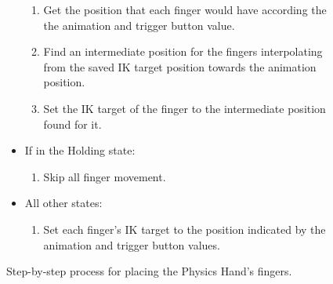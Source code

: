 \begin{figure}[H]
\begin{itemize}[noitemsep]
\begin{enumerate}[noitemsep]
\item Get the position that each finger would have according the the animation and trigger button value.
\item Find an intermediate position for the fingers interpolating from the saved IK target position towards the animation position.
\item Set the IK target of the finger to the intermediate position found for it.
\end{enumerate}
\item If in the Holding state:
\begin{enumerate}[noitemsep]
\item Skip all finger movement.
\end{enumerate}
\item All other states:
\begin{enumerate}[noitemsep]
\item Set each finger's IK target to the position indicated by the animation and trigger button values.
\end{enumerate}
\end{itemize}
\caption{Step-by-step process for placing the Physics Hand's fingers.}
\label{fig:stepByStepPhysicsHandFingers}
\end{figure}

